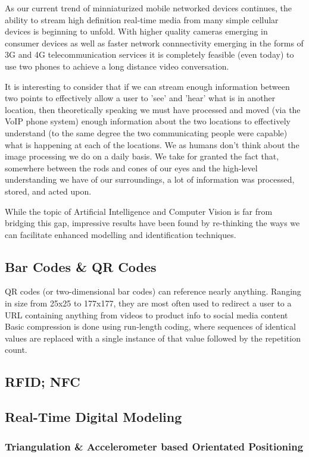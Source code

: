 \documentclass[a4paper,12pt]{report}
\begin{document}
As our current trend of minniaturized mobile networked devices continues, the ability to stream high definition real-time media from many simple cellular devices is beginning to unfold. With higher quality cameras emerging in consumer devices as well as faster network connnectivity emerging in the forms of 3G and 4G telecommunication services it is completely feasible (even today) to use two phones to achieve a long distance video conversation.

It is interesting to consider that if we can stream enough information between two points to effectively allow a user to 'see' and 'hear' what is in another location, then theoretically speaking we must have processed and moved (via the VoIP phone system) enough information about the two locations to effectively understand (to the same degree the two communicating people were capable) what is happening at each of the locations. We as humans don't think about the image processing we do on a daily basis. We take for granted the fact that, somewhere between the rods and cones of our eyes and the high-level understanding we have of our surroundings, a lot of information was processed, stored, and acted upon.

While the topic of Artificial Intelligence and Computer Vision is far from bridging this gap, impressive results have been found by re-thinking the ways we can facilitate enhanced modelling and identification techniques.

\subsection{Bar Codes \& QR Codes}
QR codes (or two-dimensional bar codes) can reference nearly anything. Ranging in size from 25x25 to 177x177, they are most often used to redirect a user to a URL containing anything from videos to product info to social media content \cite{6182398}
Basic compression is done using run-length coding, where sequences of identical values are replaced with a single instance of that value followed by the repetition count. \cite{6182398}
\subsection{RFID; NFC}
\cite{5340296}
\subsection{Real-Time Digital Modeling}

\subsubsection{Triangulation \& Accelerometer based Orientated Positioning}
\end{document}
